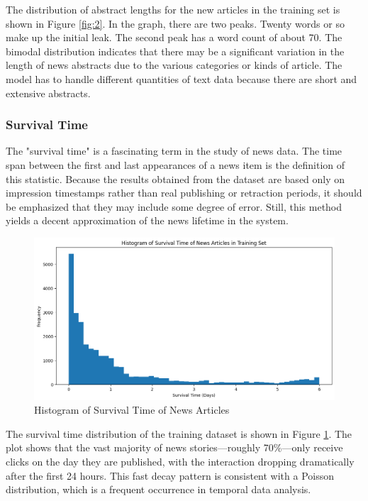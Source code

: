 \documentclass[9pt,twocolumn,twoside,lineno]{gsajnl}
\begin{document}
The distribution of abstract lengths for the new articles in the training set is shown in Figure \ref{fig:2}. In the graph, there are two peaks. Twenty words or so make up the initial leak. The second peak has a word count of about 70. The bimodal distribution indicates that there may be a significant variation in the length of news abstracts due to the various categories or kinds of article. The model has to handle different quantities of text data because there are short and extensive abstracts.

\subsubsection{Survival Time\newline}
The "survival time" is a fascinating term in the study of news data. The time span between the first and last appearances of a news item is the definition of this statistic. Because the results obtained from the dataset are based only on impression timestamps rather than real publishing or retraction periods, it should be emphasized that they may include some degree of error. Still, this method yields a decent approximation of the news lifetime in the system.

\begin{figure}
    \centering
    \includegraphics[width=\linewidth]{material/3.png}
    \caption{Histogram of Survival Time of News Articles}
    \label{fig:3}
\end{figure}

The survival time distribution of the training dataset is shown in Figure \ref{fig:3}. The plot shows that the vast majority of news stories—roughly 70\%—only receive clicks on the day they are published, with the interaction dropping dramatically after the first 24 hours. This fast decay pattern is consistent with a Poisson distribution, which is a frequent occurrence in temporal data analysis.
\end{document}
